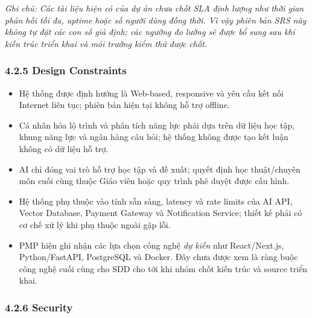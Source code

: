 \documentclass[12pt,a4paper,oneside]{report}
\begin{document}
\noindent\textit{Ghi chú: Các tài liệu hiện có của dự án chưa chốt SLA định lượng như thời gian phản hồi tối đa, uptime hoặc số người dùng đồng thời. Vì vậy phiên bản SRS này không tự đặt các con số giả định; các ngưỡng đo lường sẽ được bổ sung sau khi kiến trúc triển khai và môi trường kiểm thử được chốt.}

\subsubsection*{4.2.5 Design Constraints}

\begin{itemize}
    \item Hệ thống được định hướng là Web-based, responsive và yêu cầu kết nối Internet liên tục; phiên bản hiện tại không hỗ trợ offline.
    \item Cá nhân hóa lộ trình và phân tích năng lực phải dựa trên dữ liệu học tập, khung năng lực và ngân hàng câu hỏi; hệ thống không được tạo kết luận không có dữ liệu hỗ trợ.
    \item AI chỉ đóng vai trò hỗ trợ học tập và đề xuất; quyết định học thuật/chuyên môn cuối cùng thuộc Giáo viên hoặc quy trình phê duyệt được cấu hình.
    \item Hệ thống phụ thuộc vào tính sẵn sàng, latency và rate limits của AI API, Vector Database, Payment Gateway và Notification Service; thiết kế phải có cơ chế xử lý khi phụ thuộc ngoài gặp lỗi.
    \item PMP hiện ghi nhận các lựa chọn công nghệ \textit{dự kiến} như React/Next.js, Python/FastAPI, PostgreSQL và Docker. Đây chưa được xem là ràng buộc công nghệ cuối cùng cho SDD cho tới khi nhóm chốt kiến trúc và source triển khai.
\end{itemize}

\subsubsection*{4.2.6 Security}
\end{document}
